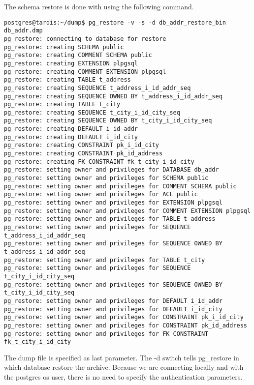 The schema restore is done with using the following command.

\begin{verbatim}
postgres@tardis:~/dump$ pg_restore -v -s -d db_addr_restore_bin db_addr.dmp 
pg_restore: connecting to database for restore
pg_restore: creating SCHEMA public
pg_restore: creating COMMENT SCHEMA public
pg_restore: creating EXTENSION plpgsql
pg_restore: creating COMMENT EXTENSION plpgsql
pg_restore: creating TABLE t_address
pg_restore: creating SEQUENCE t_address_i_id_addr_seq
pg_restore: creating SEQUENCE OWNED BY t_address_i_id_addr_seq
pg_restore: creating TABLE t_city
pg_restore: creating SEQUENCE t_city_i_id_city_seq
pg_restore: creating SEQUENCE OWNED BY t_city_i_id_city_seq
pg_restore: creating DEFAULT i_id_addr
pg_restore: creating DEFAULT i_id_city
pg_restore: creating CONSTRAINT pk_i_id_city
pg_restore: creating CONSTRAINT pk_id_address
pg_restore: creating FK CONSTRAINT fk_t_city_i_id_city
pg_restore: setting owner and privileges for DATABASE db_addr
pg_restore: setting owner and privileges for SCHEMA public
pg_restore: setting owner and privileges for COMMENT SCHEMA public
pg_restore: setting owner and privileges for ACL public
pg_restore: setting owner and privileges for EXTENSION plpgsql
pg_restore: setting owner and privileges for COMMENT EXTENSION plpgsql
pg_restore: setting owner and privileges for TABLE t_address
pg_restore: setting owner and privileges for SEQUENCE t_address_i_id_addr_seq
pg_restore: setting owner and privileges for SEQUENCE OWNED BY t_address_i_id_addr_seq
pg_restore: setting owner and privileges for TABLE t_city
pg_restore: setting owner and privileges for SEQUENCE t_city_i_id_city_seq
pg_restore: setting owner and privileges for SEQUENCE OWNED BY t_city_i_id_city_seq
pg_restore: setting owner and privileges for DEFAULT i_id_addr
pg_restore: setting owner and privileges for DEFAULT i_id_city
pg_restore: setting owner and privileges for CONSTRAINT pk_i_id_city
pg_restore: setting owner and privileges for CONSTRAINT pk_id_address
pg_restore: setting owner and privileges for FK CONSTRAINT fk_t_city_i_id_city

\end{verbatim}

The dump file is specified as last parameter. The -d switch tells pg\_restore in which database restore 
the archive. Because we are connecting locally and with the postgres os user, there is no need to specify 
the authentication parameters.\newline 

